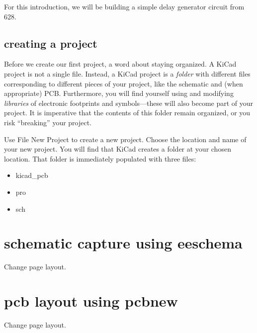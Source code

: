 \documentclass{training}
\begin{document}
For this introduction, we will be building a simple delay generator circuit from 628.

\subsection{creating a project}

Before we create our first project, a word about staying organized.
A KiCad project is not a single file.
Instead, a KiCad project is a \emph{folder} with different files corresponding to different pieces of your project, like the schematic and (when appropriate) PCB.
Furthermore, you will find yourself using and modifying \emph{libraries} of electronic footprints and symbols---these will also become part of your project.
It is imperative that the contents of this folder remain organized, or you risk ``breaking'' your project.

Use File New Project to create a new project.
Choose the location and name of your new project.
You will find that KiCad creates a folder at your chosen location.
That folder is immediately populated with three files:
\begin{itemize}
  \item kicad\_pcb
  \item pro
  \item sch
\end{itemize}


\clearpage
\section{schematic capture using eeschema}


Change page layout.

\clearpage
\section{pcb layout using pcbnew}

Change page layout.
\end{document}
